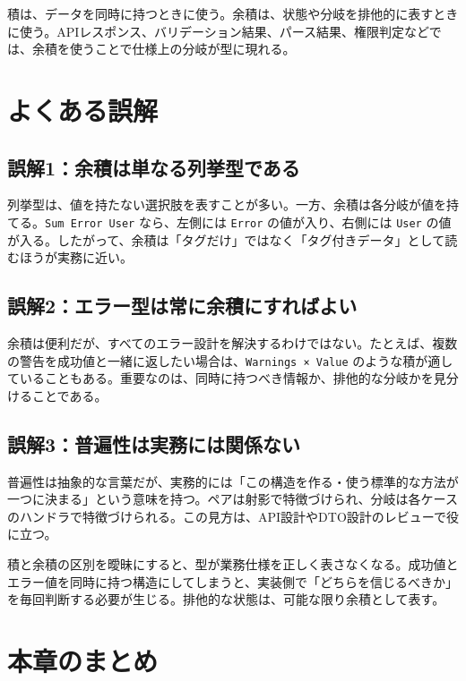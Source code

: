 \begin{softwarebox}
積は、データを同時に持つときに使う。余積は、状態や分岐を排他的に表すときに使う。APIレスポンス、バリデーション結果、パース結果、権限判定などでは、余積を使うことで仕様上の分岐が型に現れる。
\end{softwarebox}

\section{よくある誤解}

\subsection{誤解1：余積は単なる列挙型である}

列挙型は、値を持たない選択肢を表すことが多い。一方、余積は各分岐が値を持てる。\texttt{Sum Error User} なら、左側には \texttt{Error} の値が入り、右側には \texttt{User} の値が入る。したがって、余積は「タグだけ」ではなく「タグ付きデータ」として読むほうが実務に近い。

\subsection{誤解2：エラー型は常に余積にすればよい}

余積は便利だが、すべてのエラー設計を解決するわけではない。たとえば、複数の警告を成功値と一緒に返したい場合は、\texttt{Warnings × Value} のような積が適していることもある。重要なのは、同時に持つべき情報か、排他的な分岐かを見分けることである。

\subsection{誤解3：普遍性は実務には関係ない}

普遍性は抽象的な言葉だが、実務的には「この構造を作る・使う標準的な方法が一つに決まる」という意味を持つ。ペアは射影で特徴づけられ、分岐は各ケースのハンドラで特徴づけられる。この見方は、API設計やDTO設計のレビューで役に立つ。

\begin{warningbox}
積と余積の区別を曖昧にすると、型が業務仕様を正しく表さなくなる。成功値とエラー値を同時に持つ構造にしてしまうと、実装側で「どちらを信じるべきか」を毎回判断する必要が生じる。排他的な状態は、可能な限り余積として表す。
\end{warningbox}

\section{本章のまとめ}

